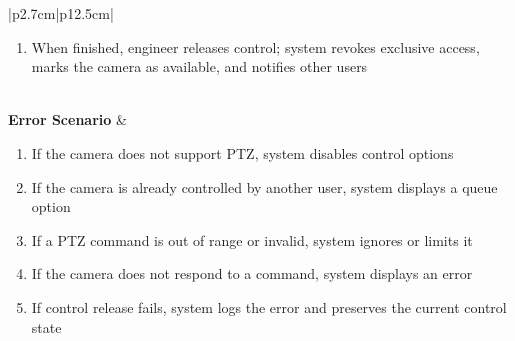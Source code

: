 \begin{table}[H]
\begin{tabular}{|p{2.7cm}|p{12.5cm}|}
\begin{minipage}[t]{\linewidth}
\begin{enumerate}[topsep=0pt,itemsep=1pt,parsep=0pt,partopsep=0pt]
                                                    which moves to the new position; stream updates to reflect the new view
                                              \item When finished, engineer releases control; system revokes exclusive access,
                                                    marks the camera as available, and notifies other users
                                          \end{enumerate}
                                      \end{minipage}                                                     \\
            \hline
            \textbf{Error Scenario} & \begin{minipage}[t]{\linewidth}
                                          \begin{enumerate}[topsep=0pt,itemsep=1pt,parsep=0pt,partopsep=0pt]
                                              \item If the camera does not support PTZ, system disables control options
                                              \item If the camera is already controlled by another user, system displays a queue
                                                    option
                                              \item If a PTZ command is out of range or invalid, system ignores or limits it
                                              \item If the camera does not respond to a command, system displays an error
                                              \item If control release fails, system logs the error and preserves the current
                                                    control state
                                          \end{enumerate}
                                      \end{minipage}                                                        \\
            \hline
        \end{tabular}
        \label{tab:eng-ptz-control}
    \end{table}

